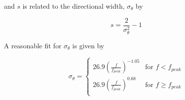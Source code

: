 and $s$ is related to the directional width, $\sigma_{\theta}$ by

\begin{equation} \label{eq:directionalDistributionFunc.sigTh}
    s = \frac{2}{\sigma_{\theta}^{2}} - 1
\end{equation}

A reasonable fit for $\sigma_{\theta}$ is given by

\begin{equation*}
  \sigma_{\theta} =
    \begin{cases}
      26.9 \left ( \frac{f}{f_{peak}} \right ) ^{-1.05} & \text{for $f < f_{peak}$}\\
      26.9 \left ( \frac{f}{f_{peak}} \right ) ^{0.68} & \text{for $f \geq f_{peak}$}\\
    \end{cases}       
\end{equation*}











